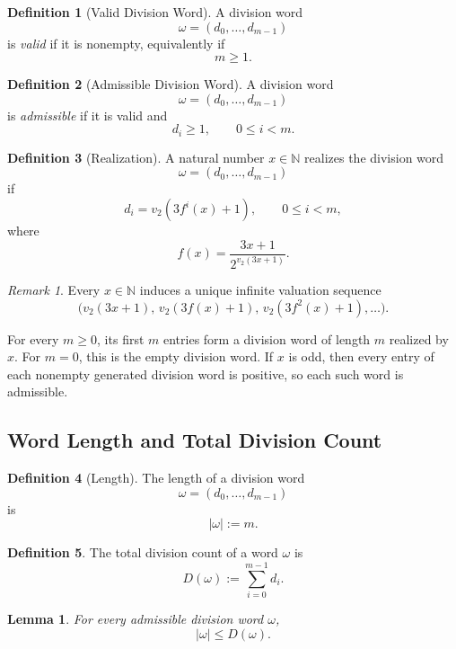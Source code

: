 \documentclass[12pt, oneside]{article}
\numberwithin{equation}{section}
\theoremstyle{definition}
\newtheorem{definition}{Definition}[section]
\theoremstyle{plain}
\newtheorem{lemma}[theorem]{Lemma}
\theoremstyle{remark}
\newtheorem*{remark}{Remark}
\begin{document}
\begin{definition}[Valid Division Word]
A division word
\[
\omega=(d_0,\dots,d_{m-1})
\]
is \emph{valid} if it is nonempty, equivalently if
\[
m\ge 1.
\]
\end{definition}

\begin{definition}[Admissible Division Word]
A division word
\[
\omega=(d_0,\dots,d_{m-1})
\]
is \emph{admissible} if it is valid and
\[
d_i\ge 1, \qquad 0\le i<m.\]
\end{definition}

\begin{definition}[Realization]
A natural number \(x\in\mathbb{N}\) realizes the division word
\[
\omega=(d_0,\dots,d_{m-1})
\]
if
\[
d_i = v_2(3f^i(x)+1),
\qquad 0 \le i < m,
\]
where
\[
f(x)=\frac{3x+1}{2^{v_2(3x+1)}}.
\]
\end{definition}

\begin{remark}
Every \(x\in\mathbb{N}\) induces a unique infinite valuation sequence
\[
\bigl(
v_2(3x+1),\,
v_2(3f(x)+1),\,
v_2(3f^2(x)+1),\dots
\bigr).
\]

For every \(m\ge0\), its first \(m\) entries form a division word of length
\(m\) realized by \(x\). For \(m=0\), this is the empty division word.
If \(x\) is odd, then every entry of each nonempty generated division
word is positive, so each such word is admissible.
\end{remark}

\subsection{Word Length and Total Division Count}

\begin{definition}[Length]
The length of a division word
\[
\omega=(d_0,\ldots,d_{m-1})
\]
is
\[
|\omega|:=m.
\]
\end{definition}

\begin{definition}
The total division count of a word $\omega$ is
\[
D(\omega) := \sum_{i=0}^{m-1} d_i.
\]
\end{definition}

\begin{lemma}
For every admissible division word $\omega$,
\[
|\omega| \le D(\omega).
\]
\end{lemma}
\end{document}
